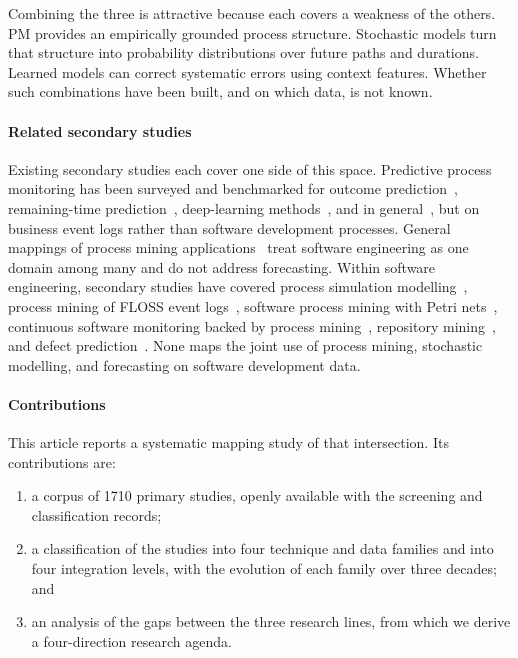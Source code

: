 \documentclass[preprint,12pt,authoryear=false]{elsarticle}
\begin{document}
Combining the three is attractive because each covers a weakness of the others. PM provides an empirically grounded process structure. Stochastic models turn that structure into probability distributions over future paths and durations. Learned models can correct systematic errors using context features. Whether such combinations have been built, and on which data, is not known.

\paragraph{Related secondary studies}
Existing secondary studies each cover one side of this space. Predictive process monitoring has been surveyed and benchmarked for outcome prediction~\cite{teinemaa2019}, remaining-time prediction~\cite{verenich2019}, deep-learning methods~\cite{ramamaneiro2023}, and in general~\cite{marquez2018}, but on business event logs rather than software development processes. General mappings of process mining applications~\cite{garcia2019,thiede2018} treat software engineering as one domain among many and do not address forecasting. Within software engineering, secondary studies have covered process simulation modelling~\cite{zhang2010,ali2014}, process mining of FLOSS event logs~\cite{mukala2015}, software process mining with Petri nets~\cite{thamizharasan2016}, continuous software monitoring backed by process mining~\cite{stepanov2026}, repository mining~\cite{kagdi2007}, and defect prediction~\cite{hall2012}. None maps the joint use of process mining, stochastic modelling, and forecasting on software development data.

\paragraph{Contributions}
This article reports a systematic mapping study of that intersection. Its contributions are:
\begin{enumerate}
\item a corpus of 1710 primary studies, openly available with the screening and classification records;
\item a classification of the studies into four technique and data families and into four integration levels, with the evolution of each family over three decades; and
\item an analysis of the gaps between the three research lines, from which we derive a four-direction research agenda.
\end{enumerate}
\end{document}
